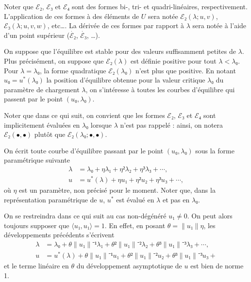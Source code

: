 \documentclass[12pt, final]{amsart}
\begin{document}
Noter que \(ℰ₂\), \(ℰ₃\) et \(ℰ₄\) sont des formes bi-, tri- et quadri-linéaires,
respectivement. L'application de ces formes à des éléments de \(U\) sera notée
\(ℰ₂(λ; u, v)\), \(ℰ₃(λ; u, v, w)\), etc\dots. La dérivée de ces formes par
rapport à \(λ\) sera notée à l'aide d'un point supérieur (\(\dot{ℰ₂}\),
\(\dot{ℰ₃}\), \dots).

On suppose que l'équilibre est stable pour des valeurs suffisamment petites de
\(λ\). Plus précisément, on suppose que \(ℰ₂(λ)\) est définie positive pour tout
\(λ<λ₀\). Pour \(λ=λ₀\), la forme quadratique \(ℰ₂(λ₀)\) n'est plus que
positive. En notant \(u₀=u^*(λ₀)\) la position d'équilibre obtenue pour la
valeur critique \(λ₀\) du paramètre de chargement \(λ\), on s'intéresse à
toutes les courbes d'équilibre qui passent par le point \((u₀, λ₀)\).

Noter que dans ce qui suit, on convient que les formes \(ℰ₂\), \(ℰ₃\) et \(ℰ₄\)
sont implicitement évaluées en \(λ₀\) lorsque \(λ\) n'est pas rappelé : ainsi,
on notera \(ℰ₂(•, •)\) plutôt que \(ℰ₂(λ₀; •, •)\).

On écrit toute courbe d'équilibre passant par le point \((u₀, λ₀)\) sous la
forme paramétrique suivante
\begin{align}
  \label{eq:20211115075817}
  λ&=λ₀+ηλ₁+η²λ₂+η³λ₃+\cdots,\\
  \label{eq:20211115075835}
  u&=u^*(λ)+ηu₁+η²u₂+η³u₃+\cdots,
\end{align}
où \(η\) est un paramètre, non précisé pour le moment. Noter que, dans la
représentation paramétrique de \(u\), \(u^*\) est évalué en \(λ\) et pas en
\(λ₀\).

On se restreindra dans ce qui suit au cas non-dégénéré \(u₁≠0\). On peut alors
toujours supposer que \(〈u₁, u₁〉=1\).  En effet, en posant \(θ=\lVert u₁\rVert η\), les développements
précédents s'écrivent
\begin{align}
  λ&=λ₀+θ\lVert u₁\rVert⁻¹λ₁+θ²\lVert u₁\rVert⁻²λ₂+θ³\lVert u₁\rVert⁻³λ₃+\cdots,\\
  u&=u^*(λ)+θ\lVert u₁\rVert⁻¹u₁+θ²\lVert u₁\rVert⁻²u₂+θ³\lVert u₁\rVert⁻³u₃+
\end{align}
et le terme linéaire en \(θ\) du développement asymptotique de \(u\) est bien
de norme 1.
\end{document}
